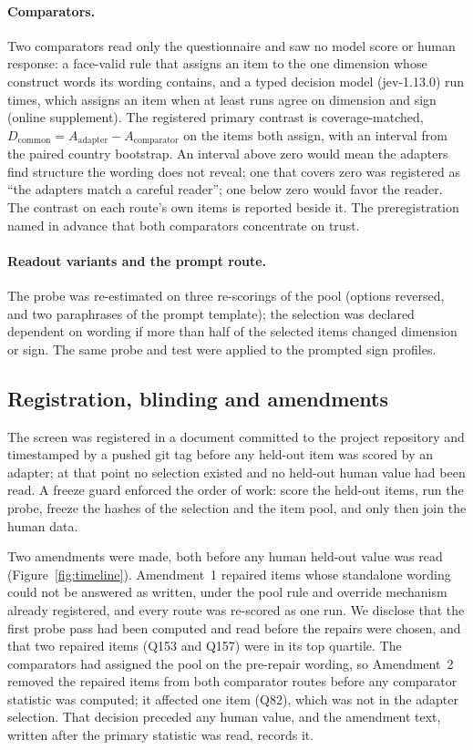 \paragraph{Comparators.} Two comparators read only the questionnaire and saw no model score or human response: a face-valid rule that assigns an item to the one dimension whose construct words its wording contains, and a typed decision model (jev-1.13.0) run  times, which assigns an item when at least  runs agree on dimension and sign (online supplement). The registered primary contrast is coverage-matched, $D_{\mathrm{common}}=A_{\mathrm{adapter}}-A_{\mathrm{comparator}}$ on the items both assign, with an interval from the paired country bootstrap. An interval above zero would mean the adapters find structure the wording does not reveal; one that covers zero was registered as ``the adapters match a careful reader''; one below zero would favor the reader. The contrast on each route's own items is reported beside it. The preregistration named in advance that both comparators concentrate on trust.

\paragraph{Readout variants and the prompt route.} The probe was re-estimated on three re-scorings of the pool (options reversed, and two paraphrases of the prompt template); the selection was declared dependent on wording if more than half of the selected items changed dimension or sign. The same probe and test were applied to the  prompted sign profiles.

\subsection{Registration, blinding and amendments}\label{sec:design-prereg}

The screen was registered in a document committed to the project repository and timestamped by a pushed git tag before any held-out item was scored by an adapter; at that point no selection existed and no held-out human value had been read. A freeze guard enforced the order of work: score the held-out items, run the probe, freeze the hashes of the selection and the item pool, and only then join the human data.

Two amendments were made, both before any human held-out value was read (Figure~\ref{fig:timeline}). Amendment~1 repaired  items whose standalone wording could not be answered as written, under the pool rule and override mechanism already registered, and every route was re-scored as one run. We disclose that the first probe pass had been computed and read before the repairs were chosen, and that two repaired items (Q153 and Q157) were in its top quartile. The comparators had assigned the pool on the pre-repair wording, so Amendment~2 removed the repaired items from both comparator routes before any comparator statistic was computed; it affected one item (Q82), which was not in the adapter selection. That decision preceded any human value, and the amendment text, written after the primary statistic was read, records it.

